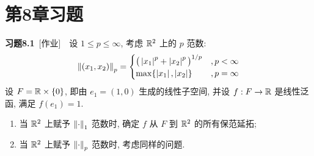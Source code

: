 \section{第8章习题}

    \textbf{习题8.1}\ [作业]\ \ 设 $ 1\leqslant p\leqslant\infty $, 考虑 $ \mathbb{R}^{2} $ 上的 $ p $ 范数:
    \[
        \left\| (x_{1}, x_{2}) \right\|_{p}=
        \begin{cases}
            \big( \left| x_{1} \right| ^{p}+\left| x_{2} \right| ^{p} \big)^{1/p} & ,p<\infty\\
            \max\{\left| x_{1} \right| , \left| x_{2} \right| \} & ,p = \infty
        \end{cases}
    \]
    设 $ F=\mathbb{R}\times\{ 0 \} $, 即由 $ e_{1}=(1, 0) $ 生成的线性子空间, 并设 $ f:F\to\mathbb{R} $ 是线性泛函, 满足 $ f(e_{1})=1 $.
    \begin{enumerate}[(1)]
        \item 当 $ \mathbb{R}^{2} $ 上赋予 $ \left\| \cdot \right\|_{1} $ 范数时, 确定 $ f $ 从 $ F $ 到 $ \mathbb{R}^{2} $ 的所有保范延拓;
        \item 当 $ \mathbb{R}^{2} $ 上赋予 $ \left\| \cdot \right\|_{p} $ 范数时, 考虑同样的问题.
    \end{enumerate}
